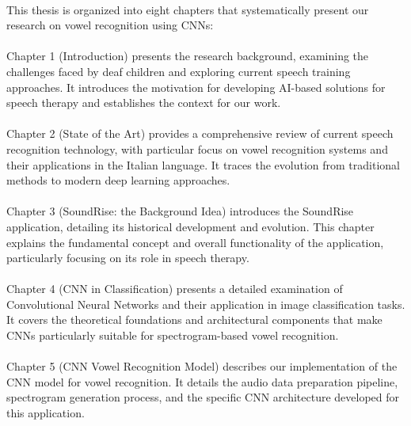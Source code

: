 \paragraph{}
This thesis is organized into eight chapters that systematically present our research on vowel recognition using CNNs:

\paragraph{}
Chapter 1 (Introduction) presents the research background, examining the challenges faced by deaf children and exploring current speech training approaches. It introduces the motivation for developing AI-based solutions for speech therapy and establishes the context for our work.

\paragraph{}
Chapter 2 (State of the Art) provides a comprehensive review of current speech recognition technology, with particular focus on vowel recognition systems and their applications in the Italian language. It traces the evolution from traditional methods to modern deep learning approaches.

\paragraph{}
Chapter 3 (SoundRise: the Background Idea) introduces the SoundRise application, detailing its historical development and evolution. This chapter explains the fundamental concept and overall functionality of the application, particularly focusing on its role in speech therapy.

\paragraph{}
Chapter 4 (CNN in Classification) presents a detailed examination of Convolutional Neural Networks and their application in image classification tasks. It covers the theoretical foundations and architectural components that make CNNs particularly suitable for spectrogram-based vowel recognition.

\paragraph{}
Chapter 5 (CNN Vowel Recognition Model) describes our implementation of the CNN model for vowel recognition. It details the audio data preparation pipeline, spectrogram generation process, and the specific CNN architecture developed for this application.

